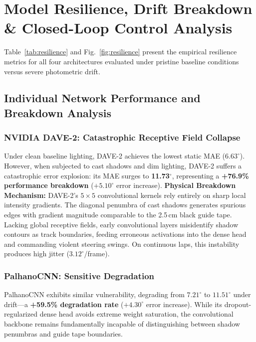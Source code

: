 \documentclass[10pt,journal,compsoc]{IEEEtran}
\begin{document}
\section{Model Resilience, Drift Breakdown \& Closed-Loop Control Analysis}
\label{sec:resilience_analysis}

Table~\ref{tab:resilience} and Fig.~\ref{fig:resilience} present the empirical resilience metrics for all four architectures evaluated under pristine baseline conditions versus severe photometric drift.


\subsection{Individual Network Performance and Breakdown Analysis}

\subsubsection{NVIDIA DAVE-2: Catastrophic Receptive Field Collapse}
Under clean baseline lighting, DAVE-2 achieves the lowest static MAE ($6.63^\circ$). However, when subjected to cast shadows and dim lighting, DAVE-2 suffers a catastrophic error explosion: its MAE surges to \textbf{11.73$^\circ$}, representing a \textbf{+76.9\% performance breakdown} ($+5.10^\circ$ error increase).
\textbf{Physical Breakdown Mechanism:} DAVE-2's $5 \times 5$ convolutional kernels rely entirely on sharp local intensity gradients. The diagonal penumbra of cast shadows generates spurious edges with gradient magnitude comparable to the 2.5\,cm black guide tape. Lacking global receptive fields, early convolutional layers misidentify shadow contours as track boundaries, feeding erroneous activations into the dense head and commanding violent steering swings. On continuous laps, this instability produces high jitter ($3.12^\circ$/frame).

\subsubsection{PalhanoCNN: Sensitive Degradation}
PalhanoCNN exhibits similar vulnerability, degrading from $7.21^\circ$ to $11.51^\circ$ under drift---a \textbf{+59.5\% degradation rate} ($+4.30^\circ$ error increase). While its dropout-regularized dense head avoids extreme weight saturation, the convolutional backbone remains fundamentally incapable of distinguishing between shadow penumbras and guide tape boundaries.
\end{document}

